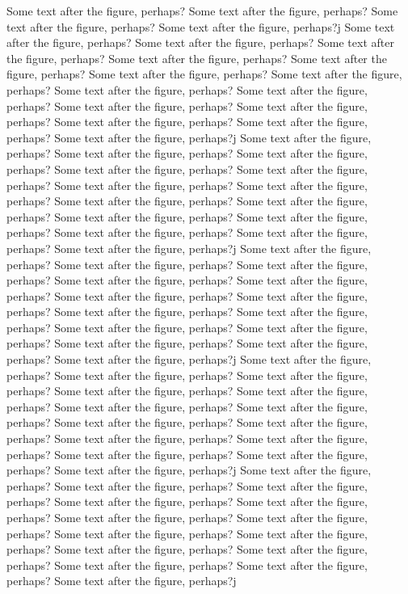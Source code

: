 Some text after the figure, perhaps? Some text after the figure, perhaps?
Some text after the figure, perhaps? Some text after the figure, perhaps?j
Some text after the figure, perhaps? Some text after the figure, perhaps?
Some text after the figure, perhaps? Some text after the figure, perhaps?
Some text after the figure, perhaps? Some text after the figure, perhaps?
Some text after the figure, perhaps? Some text after the figure, perhaps?
Some text after the figure, perhaps? Some text after the figure, perhaps?
Some text after the figure, perhaps? Some text after the figure, perhaps?
Some text after the figure, perhaps? Some text after the figure, perhaps?j
Some text after the figure, perhaps? Some text after the figure, perhaps?
Some text after the figure, perhaps? Some text after the figure, perhaps?
Some text after the figure, perhaps? Some text after the figure, perhaps?
Some text after the figure, perhaps? Some text after the figure, perhaps?
Some text after the figure, perhaps? Some text after the figure, perhaps?
Some text after the figure, perhaps? Some text after the figure, perhaps?
Some text after the figure, perhaps? Some text after the figure, perhaps?j
Some text after the figure, perhaps? Some text after the figure, perhaps?
Some text after the figure, perhaps? Some text after the figure, perhaps?
Some text after the figure, perhaps? Some text after the figure, perhaps?
Some text after the figure, perhaps? Some text after the figure, perhaps?
Some text after the figure, perhaps? Some text after the figure, perhaps?
Some text after the figure, perhaps? Some text after the figure, perhaps?
Some text after the figure, perhaps? Some text after the figure, perhaps?j
Some text after the figure, perhaps? Some text after the figure, perhaps?
Some text after the figure, perhaps? Some text after the figure, perhaps?
Some text after the figure, perhaps? Some text after the figure, perhaps?
Some text after the figure, perhaps? Some text after the figure, perhaps?
Some text after the figure, perhaps? Some text after the figure, perhaps?
Some text after the figure, perhaps? Some text after the figure, perhaps?
Some text after the figure, perhaps? Some text after the figure, perhaps?j
Some text after the figure, perhaps? Some text after the figure, perhaps?
Some text after the figure, perhaps? Some text after the figure, perhaps?
Some text after the figure, perhaps? Some text after the figure, perhaps?
Some text after the figure, perhaps? Some text after the figure, perhaps?
Some text after the figure, perhaps? Some text after the figure, perhaps?
Some text after the figure, perhaps? Some text after the figure, perhaps?
Some text after the figure, perhaps? Some text after the figure, perhaps?j



